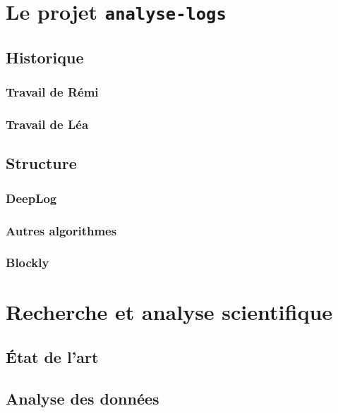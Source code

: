 \documentclass[openany, 12pt]{memoir}
\begin{document}
\cite{deeplog}

\newpage
\chapter{Le projet \texttt{analyse-logs}}

\section{Historique}

\subsection{Travail de Rémi}

\subsection{Travail de Léa}

\section{Structure}

\subsection{DeepLog}

\subsection{Autres algorithmes}

\subsection{Blockly}

\newpage
\chapter{Recherche et analyse scientifique}

\section{État de l'art}

\section{Analyse des données}

\newpage
\end{document}
